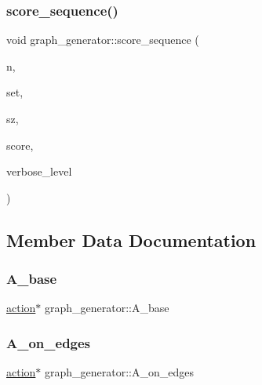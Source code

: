\subsubsection{\texorpdfstring{score\+\_\+sequence()}{score\_sequence()}}
{\footnotesize\ttfamily void graph\+\_\+generator\+::score\+\_\+sequence (\begin{DoxyParamCaption}\item[{\mbox{\hyperlink{galois_8h_a09fddde158a3a20bd2dcadb609de11dc}{I\+NT}}}]{n,  }\item[{\mbox{\hyperlink{galois_8h_a09fddde158a3a20bd2dcadb609de11dc}{I\+NT}} $\ast$}]{set,  }\item[{\mbox{\hyperlink{galois_8h_a09fddde158a3a20bd2dcadb609de11dc}{I\+NT}}}]{sz,  }\item[{\mbox{\hyperlink{galois_8h_a09fddde158a3a20bd2dcadb609de11dc}{I\+NT}} $\ast$}]{score,  }\item[{\mbox{\hyperlink{galois_8h_a09fddde158a3a20bd2dcadb609de11dc}{I\+NT}}}]{verbose\+\_\+level }\end{DoxyParamCaption})}



\subsection{Member Data Documentation}
\mbox{\label{classgraph__generator_ac9a145114c80793e4478c23952a56e77}} 
\subsubsection{\texorpdfstring{A\+\_\+base}{A\_base}}
{\footnotesize\ttfamily \mbox{\hyperlink{classaction}{action}}$\ast$ graph\+\_\+generator\+::\+A\+\_\+base}

\mbox{\label{classgraph__generator_a3e6330a8c82b67456ab80bca2083e777}} 
\subsubsection{\texorpdfstring{A\+\_\+on\+\_\+edges}{A\_on\_edges}}
{\footnotesize\ttfamily \mbox{\hyperlink{classaction}{action}}$\ast$ graph\+\_\+generator\+::\+A\+\_\+on\+\_\+edges}

